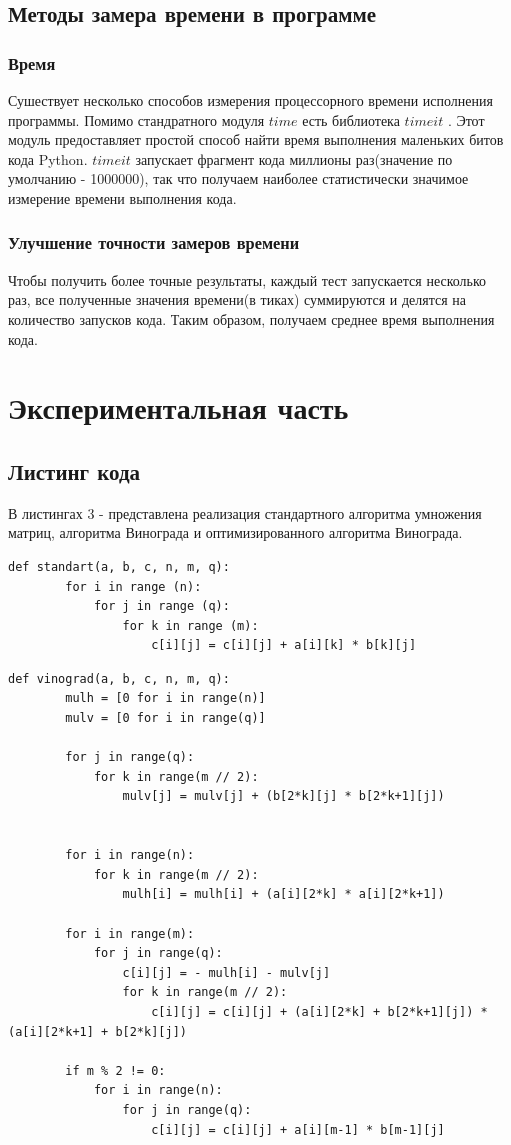 \documentclass[a4paper]{article}
\begin{document}
 \subsection{Методы замера времени в программе}
 \subsubsection{Время}
 Сушествует несколько способов измерения процессорного времени исполнения программы. 
 Помимо стандратного модуля $time$ есть библиотека $timeit$ \cite{timeit}. Этот модуль предоставляет простой способ найти время выполнения маленьких битов кода Python.
 $timeit$ запускает фрагмент кода миллионы раз(значение по умолчанию - 1000000), так что получаем наиболее статистически значимое измерение времени выполнения кода.
 \subsubsection{Улучшение точности замеров времени} Чтобы получить более точные результаты, каждый тест запускается несколько раз, все полученные значения времени(в тиках) суммируются и делятся на количество запусков кода. Таким образом, получаем среднее время выполнения кода.
 \clearpage
 
 \section{Экспериментальная часть}
 \subsection{Листинг кода}
 В листингах 3 -  представлена реализация стандартного алгоритма умножения матриц, алгоритма Винограда и оптимизированного алгоритма Винограда.
 
 \begin{lstlisting}[label = standart, caption = Стандартный алгоритм умножения матриц]
 	def standart(a, b, c, n, m, q):
 		for i in range (n):
 			for j in range (q):
 				for k in range (m):
 					c[i][j] = c[i][j] + a[i][k] * b[k][j]
 \end{lstlisting}

  \begin{lstlisting}[label = vinograd, caption = Алгоритм Винограда умножения матриц]
  	def vinograd(a, b, c, n, m, q):
	  	mulh = [0 for i in range(n)]
	  	mulv = [0 for i in range(q)]
	  	
	  	for j in range(q):
	  		for k in range(m // 2):
	  			mulv[j] = mulv[j] + (b[2*k][j] * b[2*k+1][j])
	  	
	  	
	  	for i in range(n):
	  		for k in range(m // 2):
	  			mulh[i] = mulh[i] + (a[i][2*k] * a[i][2*k+1])
	  	
	  	for i in range(m):
	  		for j in range(q):
	  			c[i][j] = - mulh[i] - mulv[j]
	  			for k in range(m // 2):
	  				c[i][j] = c[i][j] + (a[i][2*k] + b[2*k+1][j]) * (a[i][2*k+1] + b[2*k][j])
	  				
	  	if m % 2 != 0:
	  		for i in range(n):
	  			for j in range(q):
	  				c[i][j] = c[i][j] + a[i][m-1] * b[m-1][j]
\end{lstlisting}
\end{document}

